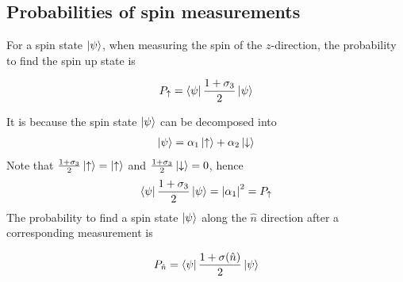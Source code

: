 \documentclass[12pt]{book} %
\numberwithin{equation}{chapter}
\def\a{\alpha}
\def\s{\sigma}
\begin{document}
\subsection*{Probabilities of spin measurements}
For a spin state $\ket{\psi}$, when measuring the spin of the $z$-direction, the probability to find the spin up state is
\begin{eqnbox}
\begin{align}
P_{\uparrow}=\bra{\psi}\frac{1+\s_{3}}{2}\ket{\psi}
\end{align}
\end{eqnbox}
It is because the spin state $\ket{\psi}$ can be decomposed into
\begin{align*}
\ket{\psi}=\a_{1}\ket{\uparrow}+\a_{2}\ket{\downarrow}
\end{align*}
Note that $\frac{1+\s_{3}}{2}\ket{\uparrow}=\ket{\uparrow}$ and $\frac{1+\s_{3}}{2}\ket{\downarrow}=0$, hence
\begin{align*}
\bra{\psi}\frac{1+\s_{3}}{2}\ket{\psi}={\left|\a_{1}\right|}^{2}=P_{\uparrow}
\end{align*}
The probability to find a spin state $\ket{\psi}$ along the $\hat{n}$ direction after a corresponding measurement is
\begin{eqnbox}
\begin{align}
P_{\hat{n}}=\bra{\psi}\frac{1+\s(\hat{n})}{2}\ket{\psi}
\end{align}
\end{eqnbox}
\end{document}
